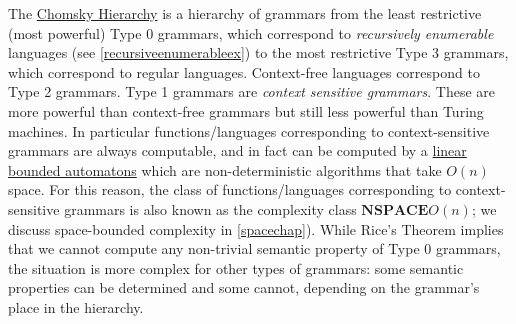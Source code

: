 The \href{https://en.wikipedia.org/wiki/Chomsky_hierarchy}{Chomsky
Hierarchy} is a hierarchy of grammars from the least restrictive (most
powerful) Type 0 grammars, which correspond to \emph{recursively
enumerable} languages (see \cref{recursiveenumerableex}) to the most
restrictive Type 3 grammars, which correspond to regular languages.
Context-free languages correspond to Type 2 grammars. Type 1 grammars
are \emph{context sensitive grammars}. These are more powerful than
context-free grammars but still less powerful than Turing machines. In
particular functions/languages corresponding to context-sensitive
grammars are always computable, and in fact can be computed by a
\href{https://en.wikipedia.org/wiki/Linear_bounded_automaton}{linear
bounded automatons} which are non-deterministic algorithms that take
\(O(n)\) space. For this reason, the class of functions/languages
corresponding to context-sensitive grammars is also known as the
complexity class \(\mathbf{NSPACE}O(n)\); we discuss space-bounded
complexity in \cref{spacechap}). While Rice's Theorem implies that we
cannot compute any non-trivial semantic property of Type 0 grammars, the
situation is more complex for other types of grammars: some semantic
properties can be determined and some cannot, depending on the grammar's
place in the hierarchy.
